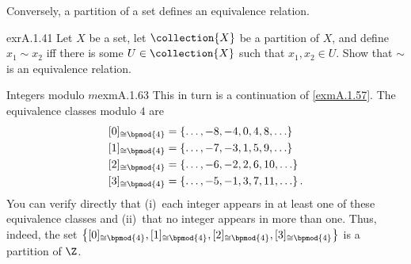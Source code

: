 Conversely, a partition of a set defines an equivalence relation.
\begin{exr}{}{exrA.1.41}
Let $X$ be a set, let $\collection{X}$ be a partition of $X$, and define $x_1\sim x_2$ iff there is some $U\in \collection{X}$ such that $x_1,x_2\in U$.  Show that $\sim$ is an equivalence relation.
\end{exr}
\begin{exm}{Integers modulo $m$}{exmA.1.63}
This in turn is a continuation of \cref{exmA.1.57}.  The equivalence classes modulo $4$ are
\begin{equation}
\begin{split}
[0]_{\cong \bpmod{4}} & =\left\{ \ldots ,-8,-4,0,4,8,\ldots \right\} \\
[1]_{\cong \bpmod{4}} & =\left\{ \ldots ,-7,-3,1,5,9,\ldots \right\} \\
[2]_{\cong \bpmod{4}} & =\left\{ \ldots ,-6,-2,2,6,10,\ldots \right\} \\
[3]_{\cong \bpmod{4}} & =\left\{ \ldots ,-5,-1,3,7,11,\ldots \right\} .
\end{split}
\end{equation}
You can verify directly that (i)~each integer appears in at least one of these equivalence classes and (ii)~that no integer appears in more than one.  Thus, indeed, the set $\left\{ [0]_{\cong \bpmod{4}},[1]_{\cong \bpmod{4}},[2]_{\cong \bpmod{4}},[3]_{\cong \bpmod{4}}\right\}$ is a partition of $\Z$.
\end{exm}

